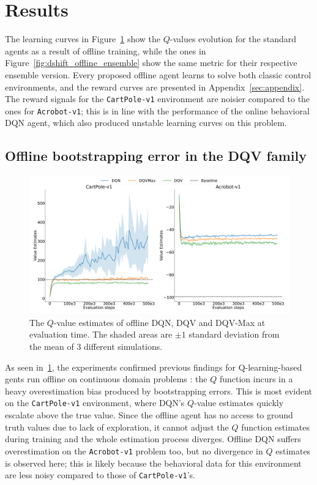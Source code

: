\section{Results}\label{sec:results}
The learning curves in Figure~\ref{fig:dshift_offline_normal} show the
$Q$-values evolution for the standard agents as a result of offline
training, while the ones in Figure~\ref{fig:dshift_offline_ensemble}
show the same metric for their respective ensemble version. Every
proposed offline agent learns to solve both classic control
environments, and the reward curves are presented in
Appendix~\ref{sec:appendix}.
The reward signals for the \texttt{CartPole-v1} environment are
noisier compared to the ones for \texttt{Acrobot-v1}; this is in line
with the performance of the online behavioral DQN agent, which also
produced unstable learning curves on this problem.

\subsection{Offline bootstrapping error in the DQV family}
\begin{figure}[!tbp]
  \centering
  \includegraphics[width=.5\textwidth]{img/dshift_plots_qv.png}
  \caption{The $Q$-value estimates of offline DQN, DQV and DQV-Max at
    evaluation time. The shaded areas are $\pm 1$ standard deviation
    from the mean of 3 different
    simulations.}\label{fig:dshift_offline_normal}
\end{figure}
As seen in~\ref{fig:dshift_offline_normal}, the experiments confirmed
previous findings for Q-learning-based gents run offline on continuous
domain problems \citep{pmlr-v97-fujimoto19a,kumar2019stabilizing}: the
$Q$ function incurs in a heavy overestimation bias produced by
bootstrapping errors. This is most evident on the \texttt{CartPole-v1}
environment, where DQN's $Q$-value estimates quickly escalate above
the true value. Since the offline agent has no access to ground truth
values due to lack of exploration, it cannot adjust the $Q$ function
estimates during training and the whole estimation process
diverges. Offline DQN suffers overestimation on the
\texttt{Acrobot-v1} problem too, but no divergence in $Q$ estimates is
observed here; this is likely because the behavioral data for this
environment are less noisy compared to those of \texttt{CartPole-v1}'s.

